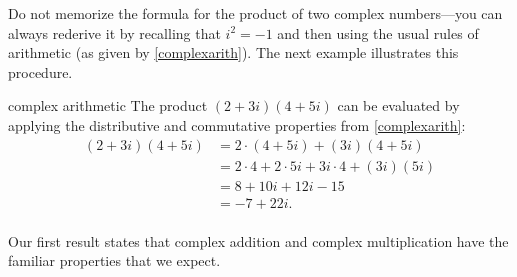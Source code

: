 Do not memorize the formula for the product of two complex numbers---you can always rederive it by recalling that
$i^2 = -1$  and then using the usual rules of arithmetic (as given by \ref{complexarith}). The next example illustrates this procedure.

\begin{example}{complex arithmetic}
The product $(2 + 3i)(4+5i)$ can be evaluated by applying the distributive and commutative properties from \ref{complexarith}:
\begin{align*}
(2 + 3i)(4+5i) &= 2 \cdot (4+5i) +(3i)(4+5i) \\
&= 2 \cdot 4 + 2 \cdot 5i + 3i\cdot 4 + (3i)(5i) \\
&= 8 + 10i + 12i -15 \\
&= -7 + 22i.\\[-24bp]
\end{align*}
\end{example}

Our first result states that complex addition and complex multiplication have the familiar properties that we expect.


